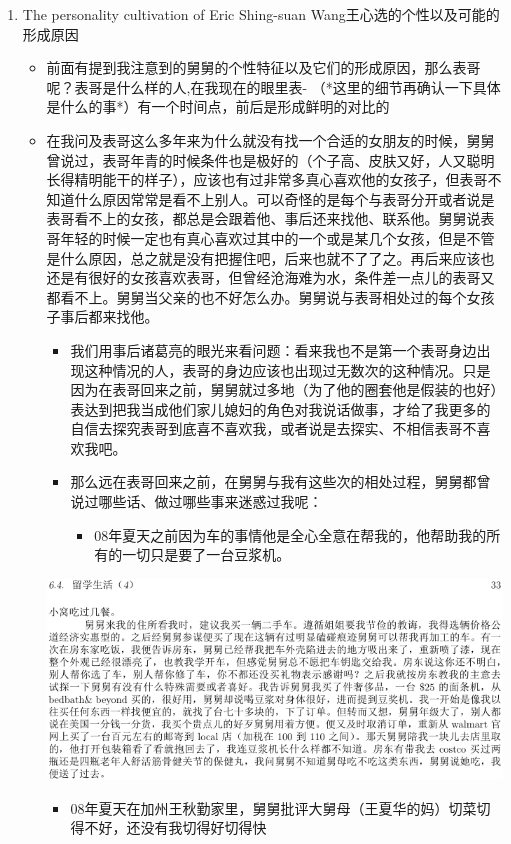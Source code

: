 \documentclass[9pt, b5paper]{article}
\begin{document}
\begin{enumerate}
\item The personality cultivation of Eric Shing-suan Wang王心选的个性以及可能的形成原因
\label{sec-11-2-4-3}
\begin{itemize}
\item 前面有提到我注意到的舅舅的个性特征以及它们的形成原因，那么表哥呢？表哥是什么样的人,在我现在的眼里表- （*这里的细节再确认一下具体是什么的事*）有一个时间点，前后是形成鲜明的对比的
\item 在我问及表哥这么多年来为什么就没有找一个合适的女朋友的时候，舅舅曾说过，表哥年青的时候条件也是极好的（个子高、皮肤又好，人又聪明长得精明能干的样子），应该也有过非常多真心喜欢他的女孩子，但表哥不知道什么原因常常是看不上别人。可以奇怪的是每个与表哥分开或者说是表哥看不上的女孩，都总是会跟着他、事后还来找他、联系他。舅舅说表哥年轻的时候一定也有真心喜欢过其中的一个或是某几个女孩，但是不管是什么原因，总之就是没有把握住吧，后来也就不了了之。再后来应该也还是有很好的女孩喜欢表哥，但曾经沧海难为水，条件差一点儿的表哥又都看不上。舅舅当父亲的也不好怎么办。舅舅说与表哥相处过的每个女孩子事后都来找他。
\begin{itemize}
\item 我们用事后诸葛亮的眼光来看问题：看来我也不是第一个表哥身边出现这种情况的人，表哥的身边应该也出现过无数次的这种情况。只是因为在表哥回来之前，舅舅就过多地（为了他的圈套他是假装的也好）表达到把我当成他们家儿媳妇的角色对我说话做事，才给了我更多的自信去探究表哥到底喜不喜欢我，或者说是去探实、不相信表哥不喜欢我吧。
\item 那么远在表哥回来之前，在舅舅与我有这些次的相处过程，舅舅都曾说过哪些话、做过哪些事来迷惑过我呢：
\begin{itemize}
\item 08年夏天之前因为车的事情他是全心全意在帮我的，他帮助我的所有的一切只是要了一台豆浆机。
\end{itemize}
\end{itemize}
\includegraphics[width=.9\linewidth]{./pic/p1p33.png}

\begin{itemize}
\item 08年夏天在加州王秋勤家里，舅舅批评大舅母（王夏华的妈）切菜切得不好，还没有我切得好切得快


\end{itemize}
\end{itemize}
\end{enumerate}
\end{document}
